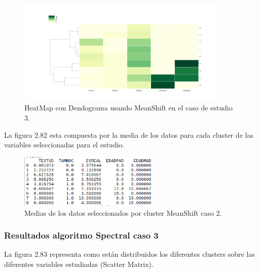 	\begin{figure}[htb]
		\centering
		\includegraphics[width=0.9\textwidth]{./imagenes/caso3/heatmapcondendograma_caso3_MeanShift}
		\caption{HeatMap con Dendograma usando MeanShift en el caso de estudio 3.} \label{fig:1}
	\end{figure}

	La figura 2.82 esta compuesta por la media de los datos para cada cluster de las variables seleccionadas
	para el estudio. \\ 

	\begin{figure}[htb]
		\centering
		\includegraphics[width=0.6\textwidth]{./imagenes/caso3/medias_datos_caso3_MeanShift}
		\caption{Medias de los datos seleccionados por cluster MeanShift caso 2.} \label{fig:1}
	\end{figure}


	\subsubsection{Resultados algoritmo Spectral caso 3}


	La figura 2.83 representa como están distribuidos los diferentes clusters sobre las diferentes variables estudiadas
	(Scatter Matrix).\\

